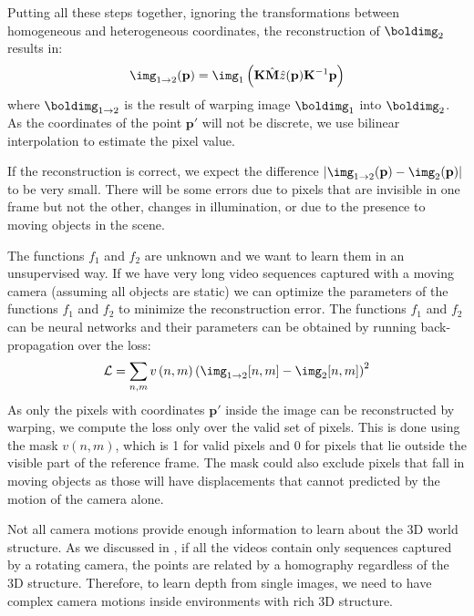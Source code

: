 Putting all these steps together, ignoring the transformations between homogeneous and heterogeneous coordinates, the reconstruction of $\boldimg_2$ results in:
\begin{equation}
    \img_{1 \rightarrow 2}(\mathbf{p}) =
    \img_1 \left( \mathbf{K} \hat{\mathbf{M}} \hat{z}(\mathbf{p}) \mathbf{K}^{-1} \mathbf{p} \right)
\end{equation}
where $\boldimg_{1 \rightarrow 2}$ is the result of warping image $\boldimg_1$ into $\boldimg_2$. As the coordinates of the point $\mathbf{p}'$ will not be discrete, we use bilinear interpolation to estimate the pixel value.


If the reconstruction is correct, we expect the difference $\left| \img_{1 \rightarrow 2}(\mathbf{p}) - \img_{2}(\mathbf{p}) \right|$ to be very small. There will be some errors due to pixels that are invisible in one frame but not the other, changes in illumination, or due to the presence to moving objects in the scene.

The functions $f_1$ and $f_2$ are unknown and we want to learn them in an unsupervised way. If we have very long video sequences captured with a moving camera (assuming all objects are static) we can optimize the parameters of the functions $f_1$ and $f_2$ to minimize the reconstruction error. The functions $f_1$ and $f_2$ can be neural networks and their parameters can be obtained by running back-propagation over the loss:
\begin{equation}
    \mathcal{L} =  \sum_{n,m} v\left(n,m \right) \left( \img_{1 \rightarrow 2}[n,m] - \img_{2}[n,m] \right) ^2
\end{equation}
As only the pixels with coordinates $\mathbf{p}'$ inside the image can be reconstructed by warping, we compute the loss only over the valid set of pixels. This is done using the mask $v\left(n,m \right)$, which is 1 for valid pixels and 0 for pixels that lie outside the visible part of the reference frame. The mask could also exclude pixels that fall in moving objects as those will have displacements that cannot predicted by the motion of the camera alone.

Not all camera motions provide enough information to learn about the 3D world structure. As we discussed in \chap{\ref{chapter:homography}}, if all the videos contain only sequences captured by a rotating camera, the points are related by a homography regardless of the 3D structure. Therefore, to learn depth from single images, we need to have complex camera motions inside environments with rich 3D structure.

